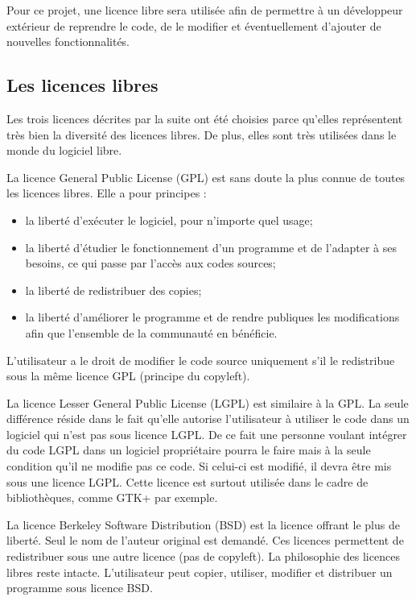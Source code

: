 	Pour ce projet, une licence libre sera utilisée afin de permettre à un développeur extérieur de reprendre le code, de le modifier et éventuellement d'ajouter de nouvelles fonctionnalités.     


	\subsection{Les licences libres}
		Les trois licences décrites par la suite ont été choisies parce qu’elles représentent très bien la diversité des licences libres. De plus, elles sont très utilisées dans le monde du logiciel libre.

		La licence General Public License (GPL) est sans doute la plus connue de toutes les licences libres. Elle a pour principes :
		\begin{itemize}
			\item la liberté d'exécuter le logiciel, pour n'importe quel usage; 
			\item la liberté d'étudier le fonctionnement d'un programme et de l'adapter à ses besoins, ce qui passe par l'accès aux codes sources;
			\item la liberté de redistribuer des copies;
			\item la liberté d'améliorer le programme et de rendre publiques les modifications afin que l'ensemble de la communauté en bénéficie.
		\end{itemize}

	L’utilisateur a le droit de modifier le code source uniquement s’il le redistribue sous la même licence GPL (principe du copyleft).

		La licence Lesser General Public License (LGPL) est similaire à la GPL. La seule différence réside dans le fait qu’elle autorise l’utilisateur à utiliser le code dans un logiciel qui n’est pas sous licence LGPL. De ce fait une personne voulant intégrer du code LGPL dans un logiciel propriétaire pourra le faire mais à la seule condition qu’il ne modifie pas ce code. Si celui-ci est modifié, il devra être mis sous une licence LGPL. Cette licence est surtout utilisée dans le cadre de bibliothèques, comme GTK+ par exemple.

		La licence Berkeley Software Distribution (BSD) est la licence offrant le plus de liberté. Seul le nom de l’auteur original est demandé. Ces licences permettent de redistribuer sous une autre licence (pas de copyleft). La philosophie des licences libres reste intacte. L’utilisateur peut copier, utiliser, modifier et distribuer un programme sous licence BSD.


